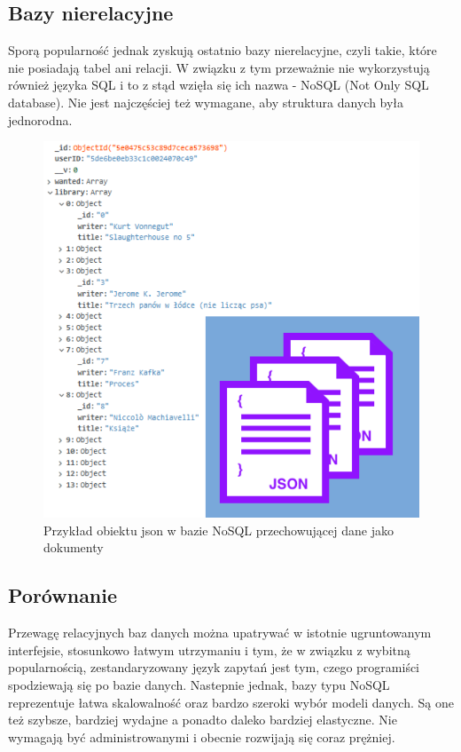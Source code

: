 \subsection{Bazy nierelacyjne}
Sporą popularność jednak zyskują ostatnio bazy nierelacyjne, czyli takie, które nie posiadają tabel ani relacji. W związku z tym przeważnie nie wykorzystują również języka SQL i to z stąd wzięła się ich nazwa - NoSQL (Not Only SQL database). Nie jest najczęściej też wymagane, aby struktura danych była jednorodna.
\begin{figure}[H]
	\centering
	\includegraphics[width=\linewidth]{nosql.pdf}
	\caption{Przykład obiektu json w bazie NoSQL przechowującej dane jako dokumenty}
\end{figure}

\subsection{Porównanie}
Przewagę relacyjnych baz danych można upatrywać w istotnie ugruntowanym interfejsie, stosunkowo łatwym utrzymaniu i tym, że w związku z wybitną popularnością, zestandaryzowany język zapytań jest tym, czego programiści spodziewają się po bazie danych.
Nastepnie jednak, bazy typu NoSQL reprezentuje łatwa skalowalność oraz bardzo szeroki wybór modeli danych. Są one też szybsze, bardziej wydajne a ponadto daleko bardziej elastyczne. Nie wymagają być administrowanymi i obecnie rozwijają się coraz prężniej.\cite{database}

